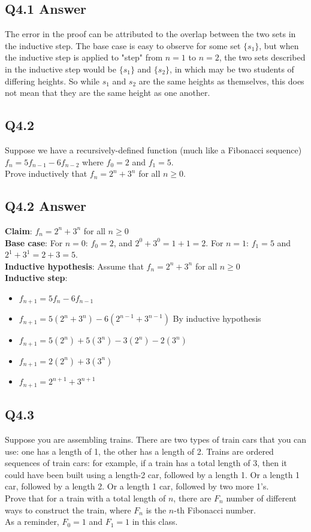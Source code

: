 \documentclass{article}
\begin{document}
\subsection*{Q4.1 Answer}
The error in the proof can be attributed to the overlap between the two sets in the inductive step. The base case is easy to observe for some set $\{s_1\}$, but when the inductive step is applied to "step" from $n=1$ to $n=2$, the two sets described in the inductive step would be $\{s_1\}$ and $\{s_2\}$, in which may be two students of differing heights. So while $s_1$ and $s_2$ are the same heights as themselves, this does not mean that they are the same height as one another.
\newpage

\subsection*{Q4.2}
Suppose we have a recursively-defined function (much like a Fibonacci sequence) $f_n=5f_{n-1}-6f_{n-2}$ where $f_0=2$ and $f_1=5$.
\\ Prove inductively that $f_n=2^n+3^n$ for all $n\geq0$.
\newpage
\subsection*{Q4.2 Answer}
\textbf{Claim}: $f_n=2^n+3^n$ for all $n\geq0$
\\ \textbf{Base case}: For $n=0$: $f_0=2$, and $2^0+3^0=1+1=2$. For $n=1$: $f_1=5$ and $2^1+3^1=2+3=5$.
\\ \textbf{Inductive hypothesis}: Assume that $f_n=2^n+3^n$ for all $n\geq0$
\\ \textbf{Inductive step}:
\begin{itemize}[label=]
    \item $f_{n+1}=5f_n-6f_{n-1}$
    \item $f_{n+1}=5(2^n+3^n)-6(2^{n-1}+3^{n-1})$ By inductive hypothesis
    \item $f_{n+1}=5(2^n)+5(3^n)-3(2^n)-2(3^n)$
    \item $f_{n+1}=2(2^n)+3(3^n)$
    \item $f_{n+1}=2^{n+1}+3^{n+1}$
\end{itemize}
\newpage

\subsection*{Q4.3}
Suppose you are assembling trains. There are two types of train cars that you can use: one has a length of 1, the other has a length of 2. Trains are ordered sequences of train cars: for example, if a train has a total length of 3, then it could have been built using a length-2 car, followed by a length 1. Or a length 1 car, followed by a length 2. Or a length 1 car, followed by two more 1's.
\\ Prove that for a train with a total length of $n$, there are $F_n$ number of different ways to construct the train, where $F_n$ is the $n$-th Fibonacci number.
\\ As a reminder, $F_0=1$ and $F_1=1$ in this class.
\newpage
\end{document}
